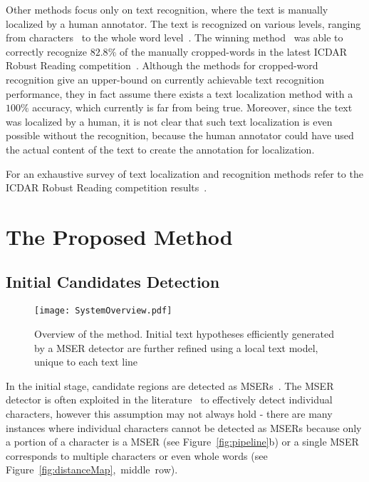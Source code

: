 \documentclass[conference]{IEEEtran}
\begin{document}
Other methods focus only on text recognition, where the text is manually localized by a human annotator. The text is recognized on various levels, ranging from characters~\cite{Iwamura2013} to the whole word level~\cite{photoocr,yao2013strokelets,leeregion}. The winning method~\cite{photoocr} was able to correctly recognize $82.8\%$ of the manually cropped-words in the latest ICDAR Robust Reading competition~\cite{ICDAR2013}. Although the methods for cropped-word recognition give an upper-bound on currently achievable text recognition performance, they in fact assume there exists a text localization method with a $100\%$ accuracy, which currently is far from being true. Moreover, since the text was localized by a human, it is not clear that such text localization is even possible without the recognition, because the human annotator could have used the actual content of the text to create the annotation for localization.

For an exhaustive survey of text localization and recognition methods refer to the ICDAR Robust Reading competition results~\cite{ICDAR2013}.



\vspace{-10pt}
\section{The Proposed Method}
\label{sec:proposedMethod}
\subsection{Initial Candidates Detection}
\label{sec:initialCandidateDetection}

\begin{figure}
\centering
\texttt{[image: SystemOverview.pdf]}
\caption{Overview of the method. Initial text hypotheses efficiently generated by a MSER detector are further refined using a local text model, unique to each text line}
\label{fig:methodoverview}
\vspace{-15pt}
\end{figure}

In the initial stage, candidate regions are detected as MSERs~\cite{Matas-MSER}. The MSER detector is often exploited in the literature~\cite{Yin-TPAMI2013,Neumann-ACCV10} to effectively detect individual characters, however this assumption may not always hold - there are many instances where individual characters cannot be detected as MSERs because only a portion of a character is a MSER (see Figure~\ref{fig:pipeline}b) or a single MSER corresponds to multiple characters or even whole words (see Figure~\ref{fig:distanceMap},~middle~row).
\end{document}
